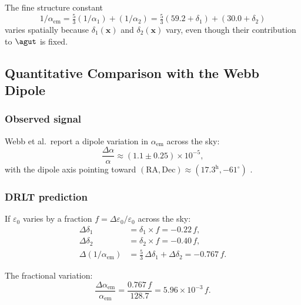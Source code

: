 \begin{corollary}
The fine structure constant
\begin{equation}
1/\alpha_\text{em} = \tfrac{5}{3}(1/\alpha_1) + (1/\alpha_2) = \tfrac{5}{3}(59.2 + \delta_1) + (30.0 + \delta_2)
\end{equation}
varies spatially because $\delta_1(\mathbf{x})$ and $\delta_2(\mathbf{x})$ vary, even though their contribution to $\agut$ is fixed.
\end{corollary}

\subsection{Quantitative Comparison with the Webb Dipole}

\subsubsection{Observed signal}

Webb et al.\ report a dipole variation in $\alpha_\text{em}$ across the sky:
\begin{equation}
\frac{\Delta\alpha}{\alpha} \approx (1.1 \pm 0.25) \times 10^{-5},
\end{equation}
with the dipole axis pointing toward $(\text{RA}, \text{Dec}) \approx (17.3^\text{h}, -61^\circ)$ \cite{Webb}.

\subsubsection{DRLT prediction}

If $\varepsilon_0$ varies by a fraction $f = \Delta\varepsilon_0/\varepsilon_0$ across the sky:
\begin{align}
\Delta\delta_1 &= \delta_1 \times f = -0.22\,f, \\
\Delta\delta_2 &= \delta_2 \times f = -0.40\,f, \\
\Delta(1/\alpha_\text{em}) &= \tfrac{5}{3}\,\Delta\delta_1 + \Delta\delta_2 = -0.767\,f.
\end{align}

The fractional variation:
\begin{equation}
\frac{\Delta\alpha_\text{em}}{\alpha_\text{em}} = \frac{0.767\,f}{128.7} = 5.96 \times 10^{-3}\,f.
\end{equation}


